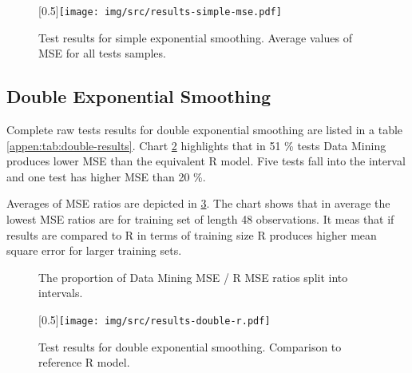         \begin{figure}[H]
            \begin{center}
                \scalebox{0.65}[0.5]{\texttt{[image: img/src/results-simple-mse.pdf]}}
                \caption{Test results for simple exponential smoothing. Average values of MSE for all tests samples.}
                \label{img:results-simple-mse}
            \end{center}
        \end{figure}

        \subsection{Double Exponential Smoothing} \label{sec:results-double}
        Complete raw tests results for double exponential smoothing are listed in a table
        \ref{appen:tab:double-results}. Chart \ref{img:results-double-pie} highlights that in 51 \% tests Data
        Mining produces lower MSE than the equivalent R model. Five tests fall into the interval
        \interval[{1.1,1.2}] and one test has higher MSE than 20 \%.

        Averages of MSE ratios are depicted in \ref{img:results-double-r}. The chart shows that in average the lowest
        MSE ratios are for training set of length 48 observations. It meas that if results are compared to R in terms of
        training size R produces higher mean square error for larger training sets.

        \begin{figure}[H]
            \begin{center}
                \caption{The proportion of Data Mining MSE / R MSE ratios split into intervals.}
                \label{img:results-double-pie}
            \end{center}
        \end{figure}

        \begin{figure}[H]
            \begin{center}
                \scalebox{0.65}[0.5]{\texttt{[image: img/src/results-double-r.pdf]}}
                \caption{Test results for double exponential smoothing. Comparison to reference R model.}
                \label{img:results-double-r}
            \end{center}
        \end{figure}

